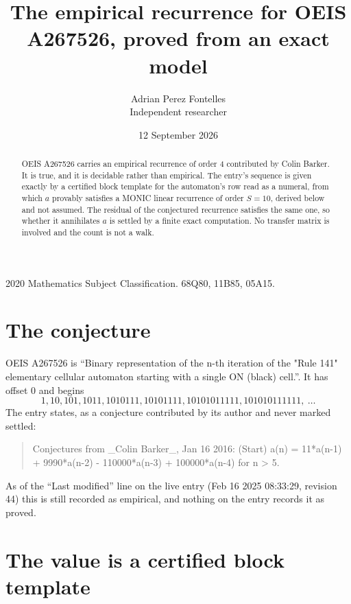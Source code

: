 \documentclass[11pt,a4paper]{article}
\title{The empirical recurrence for OEIS A267526, proved from an exact model}
\author{Adrian Perez Fontelles\\ \small Independent researcher}
\date{12 September 2026}
\theoremstyle{plain}
\theoremstyle{definition}
\begin{document}
\maketitle

\begin{abstract}
OEIS A267526 carries an empirical recurrence of order $4$ contributed by Colin Barker. It is true, and it is
decidable rather than empirical. The entry's sequence is given exactly by a certified block template for the automaton's row read as a numeral, from
which $a$ provably satisfies a MONIC linear recurrence of order $S=10$, derived below and not
assumed. The residual of the conjectured recurrence satisfies the same one, so whether it
annihilates $a$ is settled by a finite exact computation. No transfer matrix is involved and
the count is not a walk.
\end{abstract}

\noindent\small 2020 Mathematics Subject Classification. 68Q80, 11B85, 05A15.\normalsize

\section{The conjecture}

OEIS A267526 is ``Binary representation of the n-th iteration of the "Rule 141" elementary cellular automaton starting with a single ON (black) cell.''. It has offset $0$ and begins
\[
1, 10, 101, 1011, 1010111, 10101111, 10101011111, 101010111111,\ \dots
\]
The entry states, as a conjecture contributed by its author and never marked settled:
\begin{quote}
Conjectures from \_Colin Barker\_, Jan 16 2016: (Start) a(n) = 11*a(n-1) + 9990*a(n-2) - 110000*a(n-3) + 100000*a(n-4) for n > 5.
\end{quote}
As of the ``Last modified'' line on the live entry (Feb 16 2025 08:33:29, revision 44)
this is still recorded as empirical, and nothing on the entry records it as proved.

\section{The value is a certified block template}
\end{document}
